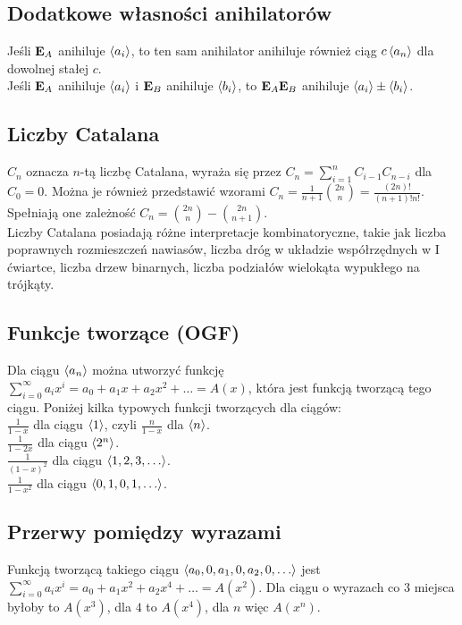 \subsection*{Dodatkowe własności anihilatorów}
Jeśli $\mathbf{E}_A$ anihiluje $\left\langle a_i \right\rangle$, to ten sam anihilator anihiluje
również ciąg $c \left\langle a_n \right\rangle$ dla dowolnej stałej $c$. \\
Jeśli $\mathbf{E}_A$ anihiluje $\left\langle a_i \right\rangle$ i $\mathbf{E}_B$ anihiluje
$\left\langle b_i \right\rangle$, to $\mathbf{E}_A \mathbf{E}_B$ anihiluje
$\left\langle a_i \right\rangle \pm \left\langle b_i \right\rangle$.

\subsection*{Liczby Catalana}
$C_n$ oznacza $n$-tą liczbę Catalana, wyraża się przez 
$C_n = \sum\limits_{i=1}^{n} C_{i-1} C_{n-i}$ dla $C_0 = 0$. Można je również
przedstawić wzorami $C_n = \frac{1}{n+1} \binom{2n}{n} = \frac{(2n)!}{(n+1)!n!}$.
Spełniają one zależność $C_n = \binom{2n}{n} - \binom{2n}{n+1}$. \\
Liczby Catalana posiadają różne interpretacje kombinatoryczne, takie jak
liczba poprawnych rozmieszczeń nawiasów, liczba dróg w układzie współrzędnych
w I ćwiartce, liczba drzew binarnych, liczba podziałów wielokąta wypukłego na trójkąty.

\subsection*{Funkcje tworzące (OGF)}
Dla ciągu $\left\langle a_n \right\rangle$ można utworzyć funkcję 
$\sum\limits_{i=0}^{\infty} a_i x^i = a_0 + a_1 x + a_2 x^2 + \ldots = A(x)$, która
jest funkcją tworzącą tego ciągu. Poniżej kilka typowych funkcji tworzących dla
ciągów: \\
$\frac{1}{1-x}$ dla ciągu $\left\langle 1 \right\rangle$, czyli $\frac{n}{1-x}$ dla $\left\langle n \right\rangle$. \\
$\frac{1}{1-2x}$ dla ciągu $\left\langle 2^n \right\rangle$. \\
$\frac{1}{(1-x)^2}$ dla ciągu $\left\langle 1, 2, 3, \ldots \right\rangle$. \\
$\frac{1}{1-x^2}$ dla ciągu $\left\langle 0, 1, 0, 1, \ldots \right\rangle$. \\

\subsection*{Przerwy pomiędzy wyrazami}
Funkcją tworzącą takiego ciągu $\left\langle a_0, 0, a_1, 0, a_2, 0, \ldots \right\rangle$ jest
$\sum\limits_{i=0}^{\infty} a_i x^i = a_0 + a_1 x^2 + a_2 x^4 + \ldots = A(x^2)$.
Dla ciągu o wyrazach co $3$ miejsca byłoby to $A(x^3)$, dla $4$ to $A(x^4)$, dla
$n$ więc $A(x^n)$.

